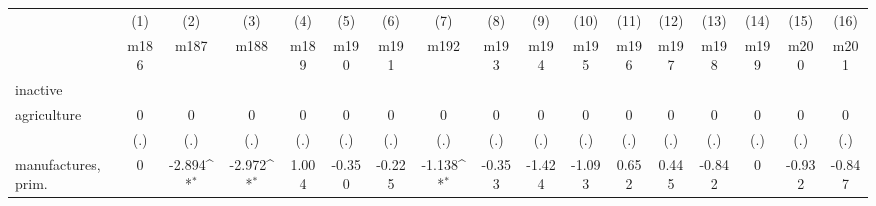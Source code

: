{
\def\sym#1{\ifmmode^{#1}\else\(^{#1}\)\fi}
\begin{tabular}{l*{16}{c}}
\hline\hline
                    &\multicolumn{1}{c}{(1)}&\multicolumn{1}{c}{(2)}&\multicolumn{1}{c}{(3)}&\multicolumn{1}{c}{(4)}&\multicolumn{1}{c}{(5)}&\multicolumn{1}{c}{(6)}&\multicolumn{1}{c}{(7)}&\multicolumn{1}{c}{(8)}&\multicolumn{1}{c}{(9)}&\multicolumn{1}{c}{(10)}&\multicolumn{1}{c}{(11)}&\multicolumn{1}{c}{(12)}&\multicolumn{1}{c}{(13)}&\multicolumn{1}{c}{(14)}&\multicolumn{1}{c}{(15)}&\multicolumn{1}{c}{(16)}\\
                    &\multicolumn{1}{c}{m186}&\multicolumn{1}{c}{m187}&\multicolumn{1}{c}{m188}&\multicolumn{1}{c}{m189}&\multicolumn{1}{c}{m190}&\multicolumn{1}{c}{m191}&\multicolumn{1}{c}{m192}&\multicolumn{1}{c}{m193}&\multicolumn{1}{c}{m194}&\multicolumn{1}{c}{m195}&\multicolumn{1}{c}{m196}&\multicolumn{1}{c}{m197}&\multicolumn{1}{c}{m198}&\multicolumn{1}{c}{m199}&\multicolumn{1}{c}{m200}&\multicolumn{1}{c}{m201}\\
\hline
inactive            &                     &                     &                     &                     &                     &                     &                     &                     &                     &                     &                     &                     &                     &                     &                     &                     \\
agriculture         &           0         &           0         &           0         &           0         &           0         &           0         &           0         &           0         &           0         &           0         &           0         &           0         &           0         &           0         &           0         &           0         \\
                    &         (.)         &         (.)         &         (.)         &         (.)         &         (.)         &         (.)         &         (.)         &         (.)         &         (.)         &         (.)         &         (.)         &         (.)         &         (.)         &         (.)         &         (.)         &         (.)         \\
[1em]
manufactures, prim. &           0         &      -2.894\sym{*}  &      -2.972\sym{*}  &       1.004         &      -0.350         &      -0.225         &      -1.138\sym{*}  &      -0.353         &      -1.424         &      -1.093         &       0.652         &       0.445         &      -0.842         &           0         &      -0.932         &      -0.847         \\

\end{tabular}}
